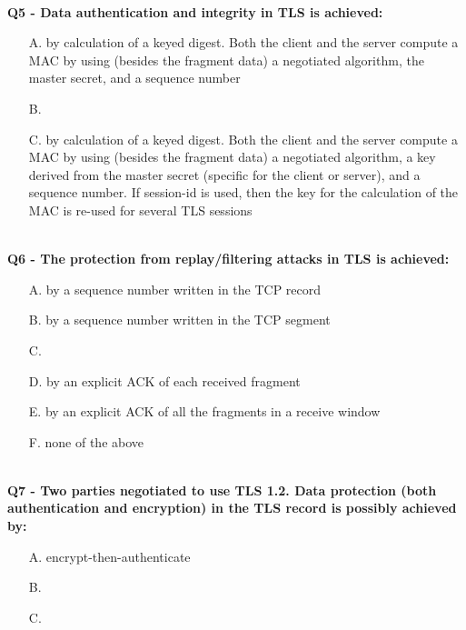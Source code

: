 \textbf{\\Q5 - Data authentication and integrity in TLS is achieved:}
\begin{itemize}
    \item[A.] by calculation of a keyed digest. Both the client and the server compute a MAC by using (besides the fragment data) a negotiated algorithm, the master secret, and a sequence number
    \item[B.] 
    \item[C.] by calculation of a keyed digest. Both the client and the server compute a MAC by using (besides the fragment data) a negotiated algorithm, a key derived from the master secret (specific for the client or server), and a sequence number. If session-id is used, then the key for the calculation of the MAC is re-used for several TLS sessions
\end{itemize}
\com{}

\textbf{\\Q6 - The protection from replay/filtering attacks in TLS is achieved:}
\begin{itemize}
    \item[A.] by a sequence number written in the TCP record
    \item[B.] by a sequence number written in the TCP segment
    \item[C.] 
    \item[D.] by an explicit ACK of each received fragment
    \item[E.] by an explicit ACK of all the fragments in a receive window
    \item[F.] none of the above
\end{itemize}
\com{}


\textbf{\\Q7 - Two parties negotiated to use TLS 1.2. Data protection (both authentication and encryption) in the TLS record is possibly achieved by:}
\begin{itemize}
    \item[A.] encrypt-then-authenticate
    \item[B.] 
    \item[C.] 
\end{itemize}

